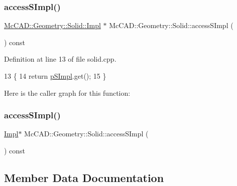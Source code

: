 \subsubsection{\texorpdfstring{access\+S\+Impl()}{accessSImpl()}\hspace{0.1cm}{\footnotesize\ttfamily [1/2]}}
{\footnotesize\ttfamily \hyperlink{classMcCAD_1_1Geometry_1_1Solid_1_1Impl}{Mc\+C\+A\+D\+::\+Geometry\+::\+Solid\+::\+Impl} $\ast$ Mc\+C\+A\+D\+::\+Geometry\+::\+Solid\+::access\+S\+Impl (\begin{DoxyParamCaption}{ }\end{DoxyParamCaption}) const}



Definition at line 13 of file solid.\+cpp.


\begin{DoxyCode}
13                                      \{
14   \textcolor{keywordflow}{return} \hyperlink{classMcCAD_1_1Geometry_1_1Solid_a77640dab3831396c6527ead13c953614}{pSImpl}.get();
15 \}
\end{DoxyCode}
Here is the caller graph for this function\+:
\mbox{\label{classMcCAD_1_1Geometry_1_1Solid_a1d058cac2d5619e21813a16706dc1826}} 
\subsubsection{\texorpdfstring{access\+S\+Impl()}{accessSImpl()}\hspace{0.1cm}{\footnotesize\ttfamily [2/2]}}
{\footnotesize\ttfamily \hyperlink{classMcCAD_1_1Geometry_1_1Solid_1_1Impl}{Impl}$\ast$ Mc\+C\+A\+D\+::\+Geometry\+::\+Solid\+::access\+S\+Impl (\begin{DoxyParamCaption}{ }\end{DoxyParamCaption}) const}



\subsection{Member Data Documentation}
\mbox{\label{classMcCAD_1_1Geometry_1_1Solid_a77640dab3831396c6527ead13c953614}} 
